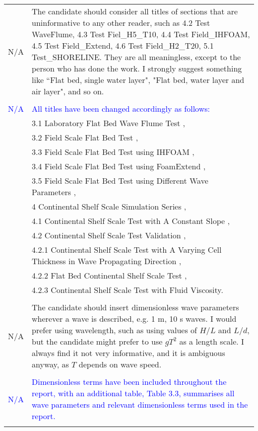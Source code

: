 \begin{center}
\begin{longtable}{ C{2cm} | L{16cm} }
    N/A & The candidate should consider all titles of sections that are uninformative to any other reader, such as 4.2 Test WaveFlume, 4.3 Test Fiel\_H5\_T10, 4.4 Test Field\_IHFOAM, 4.5 Test Field\_Extend, 4.6
    Test Field\_H2\_T20, 5.1 Test\_SHORELINE. They are all meaningless, except to the person who has
    done the work. I strongly suggest something like “Flat bed, single water layer", "Flat bed, water
    layer and air layer", and so on.   \\
    & \\
     \textcolor{blue}{N/A} & \textcolor{blue}{All titles have been changed accordingly as follows:}\\
   & 3.1 Laboratory Flat Bed Wave Flume Test , \\
   & 3.2 Field Scale Flat Bed Test ,\\
   & 3.3 Field Scale Flat Bed Test using IHFOAM ,\\
   & 3.4 Field Scale Flat Bed Test using FoamExtend ,\\
   & 3.5 Field Scale Flat Bed Test using Different Wave Parameters , \\
   & 4 Continental Shelf Scale Simulation Series ,\\
   & 4.1 Continental Shelf Scale Test with A Constant Slope , \\
   & 4.2 Continental Shelf Scale Test Validation  ,\\
   & 4.2.1 Continental Shelf Scale Test with A Varying Cell Thickness in Wave Propagating
    Direction ,\\
   & 4.2.2 Flat Bed Continental Shelf Scale Test ,\\
   & 4.2.3 Continental Shelf Scale Test with Fluid Viscosity. \\
    & \\   
    \hline    
      N/A & The candidate should insert dimensionless wave parameters wherever a wave is described, e.g. 1
    m, 10 s waves. I would prefer using wavelength, such as using values of $H/L$ and $L/d$, but the
    candidate might prefer to use $gT^2$ as a length scale. I always find it not very informative, and it is ambiguous anyway, as $T$ depends on wave speed.  \\
    & \\
    \textcolor{blue}{N/A} & \textcolor{blue}{Dimensionless terms have been included throughout the report, with an additional table, Table 3.3, summarises all wave parameters and relevant dimensionless terms used in the report.}\\ 
    & \\

\end{longtable}
\end{center}

